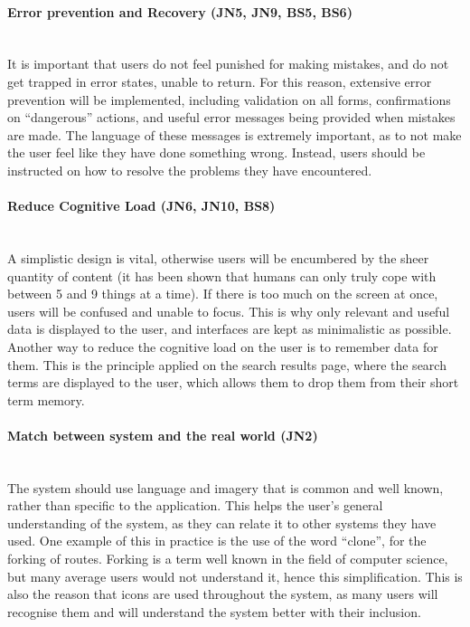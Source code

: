 \paragraph{Error prevention and Recovery (JN5, JN9, BS5, BS6)}\ \\
It is important that users do not feel punished for making mistakes, and do not get trapped in error states, unable to return. For this reason, extensive error prevention will be implemented, including validation on all forms, confirmations on ``dangerous'' actions, and useful error messages being provided when mistakes are made. The language of these messages is extremely important, as to not make the user feel like they have done something wrong. Instead, users should be instructed on how to resolve the problems they have encountered.

\paragraph{Reduce Cognitive Load (JN6, JN10, BS8)}\ \\
A simplistic design is vital, otherwise users will be encumbered by the sheer quantity of content (it has been shown that humans can only truly cope with between 5 and 9 things at a time\cite{miller1956magical}). If there is too much on the screen at once, users will be confused and unable to focus. This is why only relevant and useful data is displayed to the user, and interfaces are kept as minimalistic as possible. Another way to reduce the cognitive load on the user is to remember data for them. This is the principle applied on the search results page, where the search terms are displayed to the user, which allows them to drop them from their short term memory. 

\paragraph{Match between system and the real world (JN2)}\ \\
The system should use language and imagery that is common and well known, rather than specific to the application. This helps the user's general understanding of the system, as they can relate it to other systems they have used. One example of this in practice is the use of the word ``clone'', for the forking of routes. Forking is a term well known in the field of computer science, but many average users would not understand it, hence this simplification. This is also the reason that icons are used throughout the system, as many users will recognise them and will understand the system better with their inclusion.

